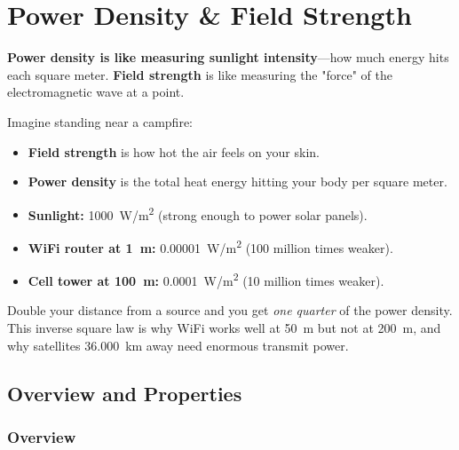 
\chapter{Power Density \& Field Strength}
\label{ch:power-density}

\begin{nontechnical}
    \textbf{Power density is like measuring sunlight intensity}---how much energy hits each square meter. \textbf{Field strength} is like measuring the "force" of the electromagnetic wave at a point.

     Imagine standing near a campfire:
    \begin{itemize}
        \item \textbf{Field strength} is how hot the air feels on your skin.
        \item \textbf{Power density} is the total heat energy hitting your body per square meter.
    \end{itemize}

    \begin{itemize}
        \item \textbf{Sunlight:} \qty{1000}{W/m^2} (strong enough to power solar panels).
        \item \textbf{WiFi router at \qty{1}{m}:} \qty{0.00001}{W/m^2} (100 million times weaker).
        \item \textbf{Cell tower at \qty{100}{m}:} \qty{0.0001}{W/m^2} (10 million times weaker).
    \end{itemize}

     Double your distance from a source and you get \emph{one quarter} of the power density. This inverse square law is why WiFi works well at \qty{50}{m} but not at \qty{200}{m}, and why satellites \qty{36,000}{km} away need enormous transmit power.
\end{nontechnical}

\section{Overview and Properties}

\subsection{Overview}

